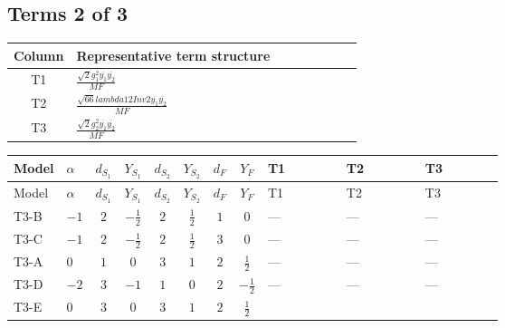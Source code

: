 \documentclass[8pt]{article}
\begin{document}
\begin{landscape}
\subsection*{Terms 2 of 3}
\begin{center}
\begin{tabular}{@{}c >{\raggedright\arraybackslash}p{0.82\linewidth}@{}}
\toprule
Column & Representative term structure \\
\midrule
T1 & \(\displaystyle \frac{\sqrt{2} g_{1}^{2} \overline{y_{1}} \overline{y_{2}}}{MF}\) \\
\midrule
T2 & \(\displaystyle \frac{\sqrt{66} lambda12Inv2 \overline{y_{1}} \overline{y_{2}}}{MF}\) \\
\midrule
T3 & \(\displaystyle \frac{\sqrt{2} g_{2}^{2} \overline{y_{1}} \overline{y_{2}}}{MF}\) \\
\midrule
\bottomrule
\end{tabular}
\end{center}
\smallskip
\tiny
\begin{longtable}{@{}llcccccc >{\raggedright\arraybackslash}p{0.21\linewidth} >{\raggedright\arraybackslash}p{0.21\linewidth} >{\raggedright\arraybackslash}p{0.21\linewidth}@{}}
\toprule
Model & $\alpha$ & $d_{S_1}$ & $Y_{S_1}$ & $d_{S_2}$ & $Y_{S_2}$ & $d_F$ & $Y_F$ & T1 & T2 & T3 \\
\midrule
\endfirsthead
\toprule
Model & $\alpha$ & $d_{S_1}$ & $Y_{S_1}$ & $d_{S_2}$ & $Y_{S_2}$ & $d_F$ & $Y_F$ & T1 & T2 & T3 \\
\midrule
\endhead
T3-B & $-1$ & $2$ & $-\frac{1}{2}$ & $2$ & $\frac{1}{2}$ & $1$ & $0$ & --- & --- & --- \\
\midrule
T3-C & $-1$ & $2$ & $-\frac{1}{2}$ & $2$ & $\frac{1}{2}$ & $3$ & $0$ & --- & --- & --- \\
\midrule
T3-A & $0$ & $1$ & $0$ & $3$ & $1$ & $2$ & $\frac{1}{2}$ & --- & --- & --- \\
\midrule
T3-D & $-2$ & $3$ & $-1$ & $1$ & $0$ & $2$ & $-\frac{1}{2}$ & --- & --- & --- \\
\midrule
T3-E & $0$ & $3$ & $0$ & $3$ & $1$ & $2$ & $\frac{1}{2}$ & \scriptsize\adjustbox{max width=\linewidth}{$\begin{gathered} \frac{3 \sqrt{2} g_{1}^{2} \overline{y_{1}} \overline{y_{2}}}{16 MF}\end{gathered}$} & \scriptsize\adjustbox{max width=\linewidth}{$\begin{gathered} \frac{3 \sqrt{66} lambda12Inv2 \overline{y_{1}} \overline{y_{2}}}{44 MF}\end{gathered}$} & \scriptsize\adjustbox{max width=\linewidth}{$\begin{gathered} \frac{45 \sqrt{2} g_{2}^{2} \overline{y_{1}} \overline{y_{2}}}{16 MF}\end{gathered}$} \\
\midrule
\bottomrule
\end{longtable}
\clearpage

\end{landscape}
\end{document}
